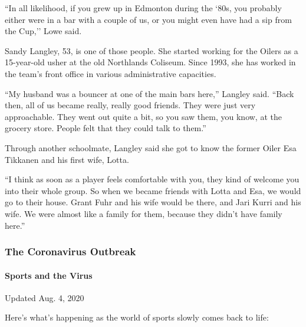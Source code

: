 ``In all likelihood, if you grew up in Edmonton during the `80s, you
probably either were in a bar with a couple of us, or you might even
have had a sip from the Cup,'' Lowe said.

Sandy Langley, 53, is one of those people. She started working for the
Oilers as a 15-year-old usher at the old Northlands Coliseum. Since
1993, she has worked in the team's front office in various
administrative capacities.

``My husband was a bouncer at one of the main bars here,'' Langley said.
``Back then, all of us became really, really good friends. They were
just very approachable. They went out quite a bit, so you saw them, you
know, at the grocery store. People felt that they could talk to them.''

Through another schoolmate, Langley said she got to know the former
Oiler Esa Tikkanen and his first wife, Lotta.

``I think as soon as a player feels comfortable with you, they kind of
welcome you into their whole group. So when we became friends with Lotta
and Esa, we would go to their house. Grant Fuhr and his wife would be
there, and Jari Kurri and his wife. We were almost like a family for
them, because they didn't have family here.''

\hypertarget{the-coronavirus-outbreak}{%
\subsubsection{The Coronavirus
Outbreak}\label{the-coronavirus-outbreak}}

\hypertarget{sports-and-the-virus}{%
\paragraph{Sports and the Virus}\label{sports-and-the-virus}}

Updated Aug. 4, 2020

Here's what's happening as the world of sports slowly comes back to
life:

